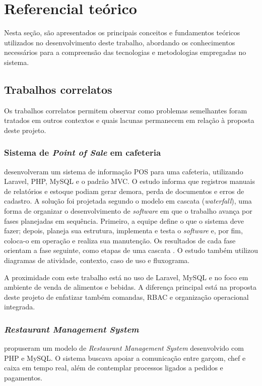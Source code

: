 \chapter[Referencial teórico]{Referencial teórico}
Nesta seção, são apresentados os principais conceitos e fundamentos teóricos utilizados no desenvolvimento deste trabalho, abordando os conhecimentos necessários para a compreensão das tecnologias e metodologias empregadas no sistema.

\section{Trabalhos correlatos}

Os trabalhos correlatos permitem observar como problemas semelhantes foram tratados em outros contextos e quais lacunas permanecem em relação à proposta deste projeto.

\subsection{Sistema de \textit{Point of Sale} em cafeteria}

 desenvolveram um sistema de informação POS para uma cafeteria, utilizando Laravel, PHP, MySQL e o padrão MVC. O estudo informa que registros manuais de relatórios e estoque podiam gerar demora, perda de documentos e erros de cadastro. A solução foi projetada segundo o modelo em cascata (\textit{waterfall}), uma forma de organizar o desenvolvimento de \textit{software} em que o trabalho avança por fases planejadas em sequência. Primeiro, a equipe define o que o sistema deve fazer; depois, planeja sua estrutura, implementa e testa o \textit{software} e, por fim, coloca-o em operação e realiza sua manutenção. Os resultados de cada fase orientam a fase seguinte, como etapas de uma cascata \cite{Sommerville2011}. O estudo também utilizou diagramas de atividade, contexto, caso de uso e fluxograma.

A proximidade com este trabalho está no uso de Laravel, MySQL e no foco em ambiente de venda de alimentos e bebidas. A diferença principal está na proposta deste projeto de enfatizar também comandas, RBAC e organização operacional integrada.

\subsection{\textit{Restaurant Management System}}

 propuseram um modelo de \textit{Restaurant Management System} desenvolvido com PHP e MySQL. O sistema buscava apoiar a comunicação entre garçom, chef e caixa em tempo real, além de contemplar processos ligados a pedidos e pagamentos.

